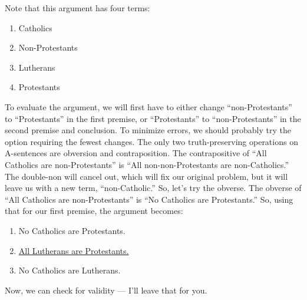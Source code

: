 \documentclass[../logic-text.tex]{subfiles}
\begin{document}
Note that this argument has four terms:

\begin{enumerate}

\item Catholics
\item Non-Protestants
\item Lutherans
\item Protestants

\end{enumerate}

To evaluate the argument, we will first have to either change \enquote{non-Protestants} to \enquote{Protestants} in the first premise, or \enquote{Protestants} to \enquote{non-Protestants} in the second premise and conclusion. To minimize errors, we should probably try the option requiring the fewest changes. The only two truth-preserving operations on A-sentences are obversion and contraposition. The contrapositive of \enquote{All Catholics are non-Protestants} is \enquote{All non-non-Protestants are non-Catholics.} The double-non will cancel out, which will fix our original problem, but it will leave us with a new term, \enquote{non-Catholic.} So, let's try the obverse. The obverse of \enquote{All Catholics are non-Protestants} is \enquote{No Catholics are Protestants.} So, using that for our first premise, the argument becomes:

\begin{enumerate}
\item No Catholics are Protestants.
\item \underline{All Lutherans are Protestants.}
\item No Catholics are Lutherans.
\end{enumerate}

Now, we can check for validity — I'll leave that for you.
\end{document}
